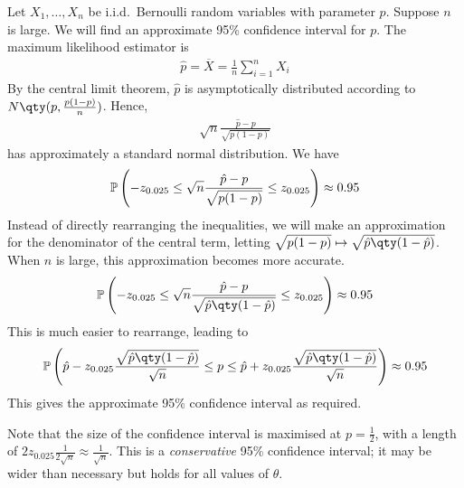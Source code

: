 \begin{example}
	Let $X_1, \dots, X_n$ be i.i.d.\ Bernoulli random variables with parameter $p$.
	Suppose $n$ is large.
	We will find an approximate 95\% confidence interval for $p$.
	The maximum likelihood estimator is
	\begin{align*}
		\hat p = \overline X = \frac{1}{n} \sum_{i=1}^n X_i
	\end{align*}
	By the central limit theorem, $\hat p$ is asymptotically distributed according to $N\qty(p, \frac{p(1-p)}{n})$.
	Hence,
	\begin{align*}
		\sqrt{n}\frac{\hat p - p}{\sqrt{p(1-p)}}
	\end{align*}
	has approximately a standard normal distribution.
	We have
	\begin{align*}
		\mathbb{P}\left({-z_{0.025} \leq \sqrt{n}\frac{\hat p - p}{\sqrt{p(1-p)}} \leq z_{0.025}}\right) \approx 0.95
	\end{align*}
	Instead of directly rearranging the inequalities, we will make an approximation for the denominator of the central term, letting $\sqrt{p(1-p)} \mapsto \sqrt{\hat p\qty(1-\hat p)}$.
	When $n$ is large, this approximation becomes more accurate.
	\begin{align*}
		\prob{-z_{0.025} \leq \sqrt{n}\frac{\hat p - p}{\sqrt{\hat p\qty(1-\hat p)}} \leq z_{0.025}} \approx 0.95
	\end{align*}
	This is much easier to rearrange, leading to
	\begin{align*}
		\prob{\hat p - z_{0.025}\frac{\sqrt{\hat p\qty(1-\hat p)}}{\sqrt{n}} \leq p \leq \hat p + z_{0.025}\frac{\sqrt{\hat p\qty(1-\hat p)}}{\sqrt{n}}} \approx 0.95
	\end{align*}
	This gives the approximate 95\% confidence interval as required.
\end{example}
\begin{remark}
	Note that the size of the confidence interval is maximised at $p = \frac{1}{2}$, with a length of $2z_{0.025} \frac{1}{2\sqrt{n}} \approx \frac{1}{\sqrt{n}}$.
	This is a \textit{conservative} 95\% confidence interval; it may be wider than necessary but holds for all values of $\theta$.
\end{remark}

